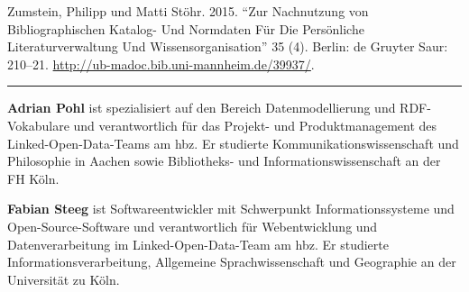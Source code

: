 \documentclass[a4paper,
fontsize=11pt,
oneside,
numbers=noperiodatend,
parskip=half-,
bibliography=totoc,
final
]{scrartcl}
\begin{document}
Zumstein, Philipp und Matti Stöhr. 2015. ``Zur Nachnutzung von
Bibliographischen Katalog- Und Normdaten Für Die Persönliche
Literaturverwaltung Und Wissensorganisation'' 35 (4). Berlin: de Gruyter
Saur: 210--21. \url{http://ub-madoc.bib.uni-mannheim.de/39937/}.

\begin{center}\rule{0.5\linewidth}{\linethickness}\end{center}

\textbf{Adrian Pohl} ist spezialisiert auf den Bereich Datenmodellierung
und RDF-Vokabulare und verantwortlich für das Projekt- und
Produktmanagement des Linked-Open-Data-Teams am hbz. Er studierte
Kommunikationswissenschaft und Philosophie in Aachen sowie Bibliotheks-
und Informationswissenschaft an der FH Köln.

\textbf{Fabian Steeg} ist Softwareentwickler mit Schwerpunkt
Informationssysteme und Open-Source-Software und verantwortlich für
Webentwicklung und Datenverarbeitung im Linked-Open-Data-Team am hbz. Er
studierte Informationsverarbeitung, Allgemeine Sprachwissenschaft und
Geographie an der Universität zu Köln.
\end{document}
